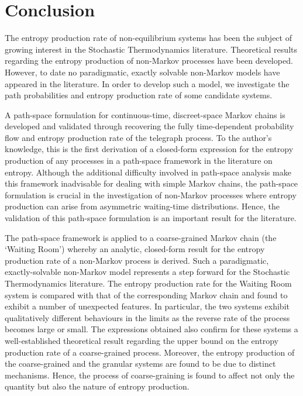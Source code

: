 \section{Conclusion}

The entropy production rate of non-equilibrium systems has been the subject of growing interest in the Stochastic Thermodynamics literature. Theoretical results regarding the entropy production of non-Markov processes have been developed. However, to date no paradigmatic, exactly solvable non-Markov models have appeared in the literature. In order to develop such a model, we investigate the path probabilities and entropy production rate of some candidate systems. 

A path-space formulation for continuous-time, discreet-space Markov chains is developed and validated through recovering the fully time-dependent probability flow and entropy production rate of the telegraph process. To the author's knowledge, this is the first derivation of a closed-form expression for the entropy production of any processes in a path-space framework in the literature on entropy. Although the additional difficulty involved in path-space analysis make this framework inadvisable for dealing with simple Markov chains, the path-space formulation is crucial in the investigation of non-Markov processes where entropy production can arise from asymmetric waiting-time distributions. Hence, the validation of this path-space formulation is an important result for the literature. 

The path-space framework is applied to a coarse-grained Markov chain (the `Waiting Room')  whereby an analytic, closed-form result for the entropy production rate of a non-Markov process is derived. Such a paradigmatic, exactly-solvable non-Markov model represents a step forward for the Stochastic Thermodynamics literature. The entropy production rate for the Waiting Room system is compared with that of the corresponding Markov chain and found to exhibit a number of unexpected features. In particular, the two systems exhibit qualitatively different behaviours in the limits as the reverse rate of the process becomes large or small. The expressions obtained also confirm for these systems a well-established theoretical result regarding the upper bound on the entropy production rate of a coarse-grained process. Moreover, the entropy production of the coarse-grained and the granular systems are found to be due to distinct mechanisms. Hence, the process of coarse-graining is found to affect not only the quantity but also the nature of entropy production. 

